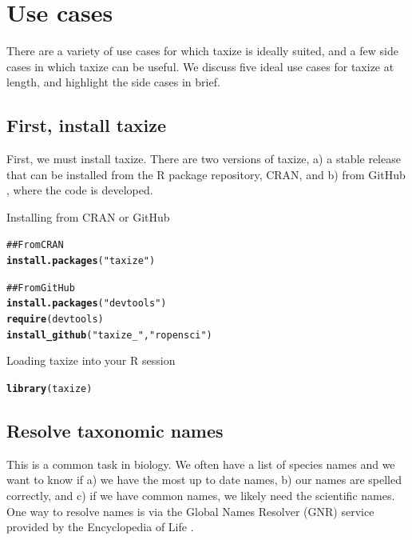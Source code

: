 \documentclass[letterpaper,superscriptaddress,showkeys,longbibliography,10pt]{revtex4-1}\usepackage{graphicx, color}
\makeatletter
\newcommand{\hlfunctioncall}[1]{\textcolor[rgb]{0.501960784313725,0,0.329411764705882}{\textbf{#1}}}%
\newcommand{\hlstring}[1]{\textcolor[rgb]{0.6,0.6,1}{#1}}%
\newcommand{\hlcomment}[1]{\textcolor[rgb]{0.180392156862745,0.6,0.341176470588235}{#1}}%
\newenvironment{kframe}{%
 \def\at@end@of@kframe{}%
 \ifinner\ifhmode%
  \def\at@end@of@kframe{\end{minipage}}%
  \begin{minipage}{\columnwidth}%
 \fi\fi%
 \def\FrameCommand##1{\hskip\@totalleftmargin \hskip-\fboxsep
 \colorbox{shadecolor}{##1}\hskip-\fboxsep
     \hskip-\linewidth \hskip-\@totalleftmargin \hskip\columnwidth}%
 \MakeFramed {\advance\hsize-\width
   \@totalleftmargin\z@ \linewidth\hsize
   \@setminipage}}%
 {\par\unskip\endMakeFramed%
 \at@end@of@kframe}
\newenvironment{knitrout}{}{} %
\makeatother
\begin{document}
\section{Use cases}

There are a variety of use cases for which taxize is ideally suited, and a few side cases in which taxize can be useful. We discuss five ideal use cases for taxize at length, and highlight the side cases in brief.

\subsection*{First, install taxize}

First, we must install taxize. There are two versions of taxize, a) a stable release that can be installed from the R package repository, CRAN, and b) from GitHub \cite{github_taxize}, where the code is developed.

Installing from CRAN or GitHub

\begin{knitrout}
\color{fgcolor}\begin{kframe}
\begin{alltt}
\hlcomment{## From CRAN}
\hlfunctioncall{install.packages}(\hlstring{"taxize"})

\hlcomment{## From GitHub}
\hlfunctioncall{install.packages}(\hlstring{"devtools"})
\hlfunctioncall{require}(devtools)
\hlfunctioncall{install_github}(\hlstring{"taxize_"}, \hlstring{"ropensci"})
\end{alltt}
\end{kframe}
\end{knitrout}


Loading taxize into your R session

\begin{knitrout}
\color{fgcolor}\begin{kframe}
\begin{alltt}
\hlfunctioncall{library}(taxize)
\end{alltt}
\end{kframe}
\end{knitrout}


\subsection{Resolve taxonomic names}

This is a common task in biology. We often have a list of species names and we want to know if a) we have the most up to date names, b) our names are spelled correctly, and c) if we have common names, we likely need the scientific names. One way to resolve names is via the Global Names Resolver (GNR) service provided by the Encyclopedia of Life \cite{eolgnr}.
\end{document}
